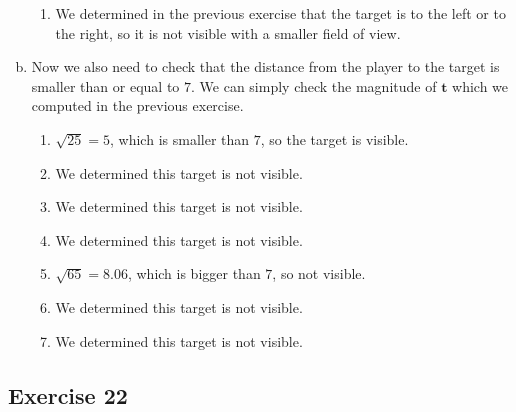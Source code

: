 \documentclass[11pt]{article}
\begin{document}
\begin{enumerate}[a.]
\begin{enumerate}[1.)]
	\item %
	We determined in the previous exercise that the target is to the left or to the right, so it is not visible with a smaller field of view.
	
	\end{enumerate}
	
	\item %
	Now we also need to check that the distance from the player to the target is smaller than or equal to $7$. We can simply check the magnitude of $\textbf{t}$ which we computed in the previous exercise.
	\begin{enumerate}
		\item %
			$\sqrt{25}=5$, which is smaller than $7$, so the target is visible.
		\item %
		We determined this target is not visible.
		\item %
		We determined this target is not visible.
		\item %
		We determined this target is not visible.
		\item %
			$\sqrt{65}=8.06$, which is bigger than $7$, so not visible.
		\item %
		We determined this target is not visible.
		\item %
		We determined this target is not visible.
	\end{enumerate}
\end{enumerate}

\subsection{Exercise 22}
\end{document}
